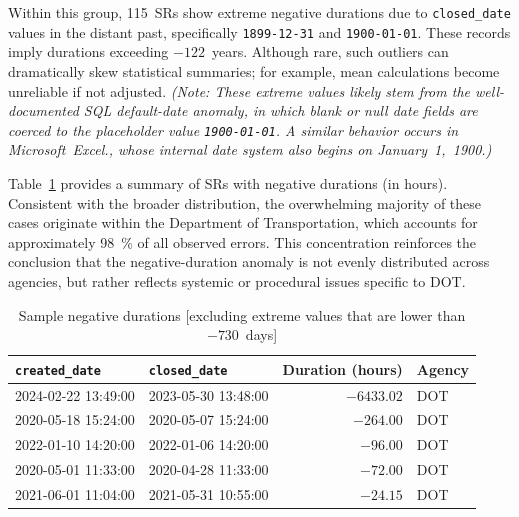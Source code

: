 \documentclass[linenumber]{jdsart}
\begin{document}
Within this group, 115~\textsc{SR}s show extreme negative durations due to 
\texttt{closed\_date} values in the distant past, specifically 
\texttt{1899-12-31} and \texttt{1900-01-01}. 
These records imply durations exceeding $-122$~years. 
Although rare, such outliers can dramatically skew statistical summaries; 
for example, mean calculations become unreliable if not adjusted. 
{\small\emph{(Note: These extreme values likely stem from the well-documented 
SQL default-date anomaly, in which blank or null date fields are coerced to 
the placeholder value \texttt{1900-01-01}. A similar behavior occurs 
in Microsoft~Excel., whose internal date system also begins on January~1,~1900.)}}

Table~\ref{tab:largest-errors} provides a summary of 
\textsc{SR}s with negative durations (in hours). 
Consistent with the broader distribution, the overwhelming majority of 
these cases originate within the Department of Transportation, which 
accounts for approximately \SI{98}{\percent} of all observed errors. 
This concentration reinforces the conclusion that the negative-duration 
anomaly is not evenly distributed across agencies, but rather reflects 
systemic or procedural issues specific to \textsc{DOT}.


\begin{table}[tbp]
    \centering
    \caption{Sample negative durations [excluding extreme values that 
    are lower than $-730$~days]}
    \label{tab:largest-errors}
    \small
    \begin{tabular}{l l r l}
        \toprule
        \texttt{created\_date} & \texttt{closed\_date} & 
        {Duration (hours)} & {Agency} \\
        \midrule
        2024-02-22 13:49:00 & 2023-05-30 13:48:00 & $-6433.02$ & DOT \\
        2020-05-18 15:24:00 & 2020-05-07 15:24:00 & $-264.00$  & DOT \\
        2022-01-10 14:20:00 & 2022-01-06 14:20:00 & $-96.00$   & DOT \\
        2020-05-01 11:33:00 & 2020-04-28 11:33:00 & $-72.00$   & DOT \\
        2021-06-01 11:04:00 & 2021-05-31 10:55:00 & $-24.15$   & DOT \\
        \bottomrule
    \end{tabular}
\end{table}
\end{document}
